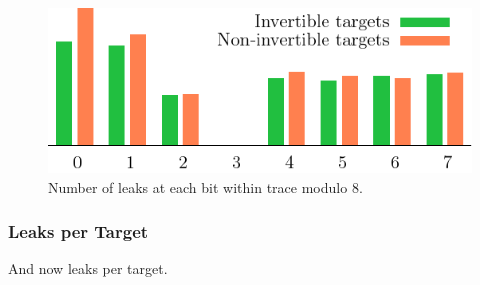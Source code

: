 	\begin{figure}[h]
	\begin{center}
		\includegraphics{figures/leak_bit/inv_vs_non-inv.pdf}
		\caption{Number of leaks at each bit within trace modulo $8$.}
		\label{fig:leakbitinv}
	\end{center}
	\end{figure}
	

\subsubsection{Leaks per Target}
	
	And now leaks per target. %
	
